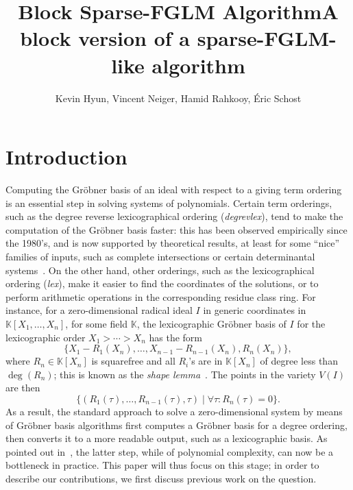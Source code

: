 \documentclass[12pt]{article}
\title{Block Sparse-FGLM Algorithm}
\title{A block version of a sparse-FGLM-like algorithm}
\author{Kevin Hyun, Vincent Neiger, Hamid Rahkooy, \'Eric Schost}
\def\K{\mathbb{K}}
\def\K {\ensuremath{\mathbb{K}}}
\begin{document}
\maketitle


\section{Introduction}

Computing the Gr\"obner basis of an ideal with respect to a giving
term ordering is an essential step in solving systems of polynomials.
Certain term orderings, such as the degree reverse lexicographical
ordering (\textit{degrevlex}), tend to make the computation of the
Gr\"obner basis faster: this has been observed empirically since the
1980's, and is now supported by theoretical results, at least for some
``nice'' families of inputs, such as complete intersections or certain
determinantal systems~\cite{Faugere02,FaSaSp13,BaFaSa15}.  On the
other hand, other orderings, such as the lexicographical ordering
(\textit{lex}), make it easier to find the coordinates of the
solutions, or to perform arithmetic operations in the corresponding
residue class ring.  For instance, for a zero-dimensional radical
ideal $I$ in generic coordinates in $\K[X_1,\dots,X_n]$, for some field $\K$,
the lexicographic Gr\"obner basis of $I$ for the lexicographic order $X_1 > \cdots > X_n$
has the form
\begin{equation}\label{eq:shapelemma}
 \{ X_1 - R_1(X_n),\dots, X_{n-1}-R_{n-1}(X_n),R_n(X_n)\},
\end{equation}
where $R_n \in \K[X_n]$ is squarefree and all $R_i$'s are in $\K[X_n]$
of degree less than $\deg(R_n)$; this is known as the {\em shape
  lemma}~\cite{GiMo89}. The points in the variety $V(I)$ are then
$$\{ ( R_1(\tau), \dots, R_{n-1}(\tau), \tau ) \mid \forall
 \tau: R_n(\tau)=0\}.$$ As a result, the standard approach to
 solve a zero-dimensional system by means of Gr\"obner basis
 algorithms first computes a Gr\"obner basis for a degree ordering,
 then converts it to a more readable output, such as a lexicographic
 basis. As pointed out in~\cite{FaMo17}, the latter step, while of
 polynomial complexity, can now be a bottleneck in practice. This
 paper will thus focus on this stage; in order to describe our 
 contributions, we first discuss previous work on the question.
\end{document}
